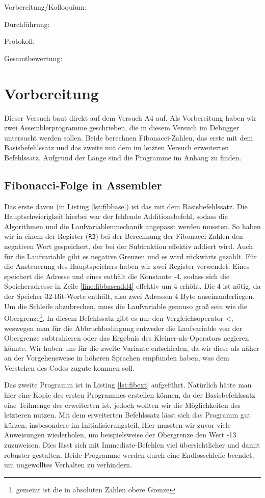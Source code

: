 \documentclass[12pt,a4paper]{scrartcl}
\begin{document}
Vorbereitung/Kolloquium:

Durchf\"uhrung:

Protokoll:

Gesamtbewertung:
\clearpage



\section{Vorbereitung}
Dieser Versuch baut direkt auf dem Versuch A4 auf.
Als Vorbereitung haben wir zwei Assemblerprogramme geschrieben, die in diesem Versuch im Debugger untersucht werden sollen.
Beide berechnen Fibonacci-Zahlen, das erste mit dem Basisbefehlssatz und das zweite mit dem im letzten Versuch erweiterten Befehlssatz.
Aufgrund der L\"ange sind die Programme im Anhang zu finden.

\subsection*{Fibonacci-Folge in Assembler}
Das erste davon (in Listing \ref{lst:fibbase}) ist das mit dem Basisbefehlssatz.
Die Hauptschwierigkeit hierbei war der fehlende Additionsbefehl, sodass die Algorithmen und die Laufvariablenmechanik angepasst werden mussten.
So haben wir in einem der Register (\texttt{R3}) bei der Berechnung der Fibonacci-Zahlen den negativen Wert gespeichert, der bei der Subtraktion effektiv addiert wird.
Auch f\"ur die Laufvariable gibt es negative Grenzen und es wird r\"uckw\"arts gez\"ahlt.
F\"ur die Ansteuerung des Hauptspeichers haben wir zwei Register verwendet:
Eines speichert die Adresse und eines enth\"alt die Konstante -4, sodass sich die Speicheradresse in Zeile \ref{line:fibbaseadd4} effektiv um 4 erh\"oht.
Die 4 ist n\"otig, da der Speicher 32-Bit-Worte enth\"alt, also zwei Adressen 4 Byte auseinanderliegen.
Um die Schleife abzubrechen, muss die Laufvariable genauso gro\ss{} sein wie die Obergrenze\footnote{gemeint ist die in absoluten Zahlen obere Grenze}.
In diesem Befehlssatz gibt es nur den Vergleichsoperator <, weswegen man f\"ur die Abbruchbedingung entweder die Laufvariable von der Obergrenze subtrahieren oder das Ergebnis des Kleiner-als-Operators negieren k\"onnte.
Wir haben uns f\"ur die zweite Variante entschieden, da wir diese als n\"aher an der Vorgehensweise in h\"oheren Sprachen empfunden haben, was dem Verstehen des Codes zugute kommen soll.

Das zweite Programm ist in Listing \ref{lst:fibext} aufgef\"uhrt.
Nat\"urlich h\"atte man hier eine Kopie des ersten Programmes erstellen k\"onnen, da der Basisbefehlssatz eine Teilmenge des erweiterten ist, jedoch wollten wir die M\"oglichkeiten des letzteren nutzen.
Mit dem erweiterten Befehlssatz l\"asst sich das Programm gut k\"urzen, insbesondere im Initialisierungsteil.
Hier mussten wir zuvor viele Anweisungen wiederholen, um beispielsweise der Obergrenze den Wert -13 zuzuweisen.
Dies l\"asst sich mit Immediate-Befehlen viel \"ubersichtlicher und damit robuster gestalten.
Beide Programme werden durch eine Endlosschleife beendet, um ungewolltes Verhalten zu verhindern.
\end{document}
